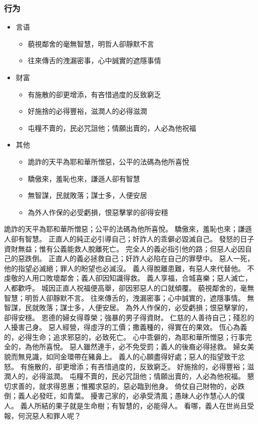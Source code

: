 \subsubsection{行为}
\begin{itemize}
\itemsep-.45em
\item 言语
\begin{itemize}
\itemsep-.45em  
\item 藐視鄰舍的毫無智慧，明哲人卻靜默不言
\item 往來傳舌的洩漏密事，心中誠實的遮隱事情
\end{itemize}
\item 财富
\begin{itemize}
\itemsep-.45em  
\item 有施散的卻更增添，有吝惜過度的反致窮乏
\item 好施捨的必得豐裕，滋潤人的必得滋潤
\item 屯糧不賣的，民必咒詛他；情願出賣的，人必為他祝福
\end{itemize}
\item 其他  
\begin{itemize}
\itemsep-.45em  
\item 詭詐的天平為耶和華所憎惡，公平的法碼為他所喜悅
\item 驕傲來，羞恥也來，謙遜人卻有智慧
\item 無智謀，民就敗落；謀士多，人便安居
\item 為外人作保的必受虧損，恨惡擊掌的卻得安穩
\end{itemize}
\end{itemize}

詭詐的天平為耶和華所憎惡；公平的法碼為他所喜悅。
驕傲來，羞恥也來；謙遜人卻有智慧。
正直人的純正必引導自己；奸詐人的乖僻必毀滅自己。
發怒的日子資財無益；惟有公義能救人脫離死亡。
完全人的義必指引他的路；但惡人必因自己的惡跌倒。
正直人的義必拯救自己；奸詐人必陷在自己的罪孽中。
惡人一死，他的指望必滅絕；罪人的盼望也必滅沒。
義人得脫離患難，有惡人來代替他。
不虔敬的人用口敗壞鄰舍；義人卻因知識得救。
義人享福，合城喜樂；惡人滅亡，人都歡呼。
城因正直人祝福便高舉，卻因邪惡人的口就傾覆。
藐視鄰舍的，毫無智慧；明哲人卻靜默不言。
往來傳舌的，洩漏密事；心中誠實的，遮隱事情。
無智謀，民就敗落；謀士多，人便安居。
為外人作保的，必受虧損；恨惡擊掌的，卻得安穩。
恩德的婦女得尊榮；強暴的男子得資財。
仁慈的人善待自己；殘忍的人擾害己身。
惡人經營，得虛浮的工價；撒義種的，得實在的果效。
恆心為義的，必得生命；追求邪惡的，必致死亡。
心中乖僻的，為耶和華所憎惡；行事完全的，為他所喜悅。
惡人雖然連手，必不免受罰；義人的後裔必得拯救。
婦女美貌而無見識，如同金環帶在豬鼻上。
義人的心願盡得好處；惡人的指望致干忿怒。
有施散的，卻更增添；有吝惜過度的，反致窮乏。
好施捨的，必得豐裕；滋潤人的，必得滋潤。
屯糧不賣的，民必咒詛他；情願出賣的，人必為他祝福。
懇切求善的，就求得恩惠；惟獨求惡的，惡必臨到他身。
倚仗自己財物的，必跌倒；義人必發旺，如青葉。
擾害己家的，必承受清風；愚昧人必作慧心人的僕人。
義人所結的果子就是生命樹；有智慧的，必能得人。
看哪，義人在世尚且受報，何況惡人和罪人呢？


